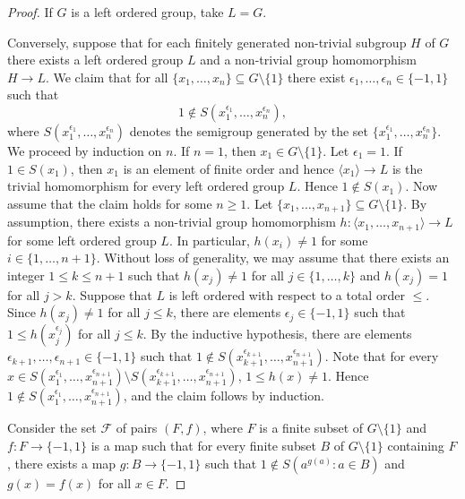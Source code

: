 \begin{proof}
	If $G$ is a left ordered group, take $L=G$. 
	
	Conversely, suppose that for each finitely generated non-trivial subgroup $H$ of $G$ there exists a left ordered group $L$ 
and a non-trivial group homomorphism $H\to L$. We claim that for all $\{x_1,\dots,x_n\}\subseteq G\setminus\{1\}$ 
	there exist $\epsilon_1,\dots,\epsilon_n\in\{-1,1\}$ such that 
	\[
	1\not\in S(x_1^{\epsilon_1},\dots,x_n^{\epsilon_n}),
	\]
	where $S(x_1^{\epsilon_1},\dots,x_n^{\epsilon_n})$ denotes the semigroup generated by 
	the set $\{x_1^{\epsilon_1},\dots,x_n^{\epsilon_n}\}$. 
	We proceed by induction on $n$. If $n=1$, then $x_1\in G\setminus\{1\}$. Let $\epsilon_1=1$. If
	$1\in S(x_1)$, then $x_1$ is an element of finite order and hence $\langle x_1\rangle\to L$ is the trivial homomorphism for every left ordered group $L$. Hence $1\notin S(x_1)$.
    Now assume that the claim holds for some $n\geq 1$. Let $\{x_1,\dots,x_{n+1}\}\subseteq G\setminus\{1\}$. 
	By assumption, there exists a non-trivial group homomorphism 
	$h\colon\langle x_1,\dots,x_{n+1}\rangle\to L$ for some left ordered group $L$. In particular, $h(x_i)\ne 1$ for some $i\in\{1,\dots,n+1\}$. Without loss
	of generality, we may assume that there exists an integer $1\leq k\leq n+1$ such that $h(x_j)\ne 1$ for all $j\in\{1,\dots,k\}$ and 
	$h(x_j)=1$ for all $j>k$. Suppose that $L$ is left ordered with respect to a total order $\leq$. Since $h(x_j)\ne 1$ for all $j\leq k$, there
	are elements $\epsilon_j\in\{-1,1\}$ such that $1\leq h(x_j^{\epsilon_j})$ for all $j\leq k$. By the inductive hypothesis, 
	there are elements $\epsilon_{k+1},\dots,\epsilon_{n+1}\in\{-1,1\}$ such that 
	$1\not\in S(x_{k+1}^{\epsilon_{k+1}},\dots,x_{n+1}^{\epsilon_{n+1}})$. Note that for every  $x\in S(x_1^{\epsilon_1},\dots,x_{n+1}^{\epsilon_{n+1}})\setminus S(x_{k+1}^{\epsilon_{k+1}},\dots,x_{n+1}^{\epsilon_{n+1}})$, $1\leq h(x)\neq 1$. Hence $1\notin S(x_1^{\epsilon_1},\dots ,x_{n+1}^{\epsilon_{n+1}})$, and the claim follows by induction.
	
	Consider the set $\mathcal{F}$ of pairs $(F,f)$, where $F$ is a finite subset  of $G\setminus\{ 1\}$ and $f\colon F\to\{ -1, 1\}$ is a map such that for every finite subset $B$ of $G\setminus\{ 1\}$ containing $F$, there exists a map  $g\colon B\to \{ -1,1\}$ such that  $1\notin S(a^{g(a)} : a\in B)$ and $g(x)=f(x)$ for all $x\in F$. 
	

\end{proof}
